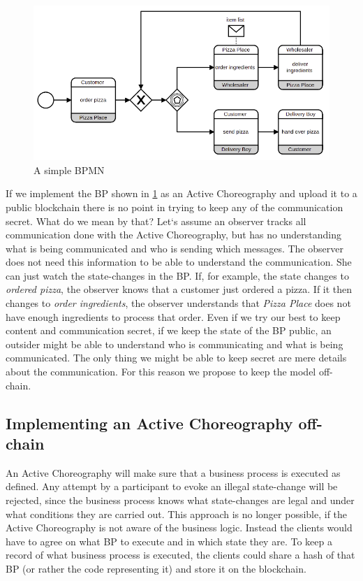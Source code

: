\documentclass[runningheads]{llncs}
\begin{document}
\begin{figure}
    \centering
    \includegraphics[scale=0.6]{bpmn.png}
    \caption{A simple BPMN}
    \label{fig:BPmn}
\end{figure}

If we implement the BP shown in \ref{fig:BPmn} as an Active Choreography and upload it to a public blockchain there is no point in trying to keep any of the communication secret. What do we mean by that? Let`s assume an observer tracks all communication done with the Active Choreography, but has no understanding what is being communicated and who is sending which messages. The observer does not need this information to be able to understand the communication. She can just watch the state-changes in the BP. If, for example, the state changes to \textit{ordered pizza}, the observer knows that a customer just ordered a pizza. If it then changes to \textit{order ingredients}, the observer understands that \textit{Pizza Place} does not have enough ingredients to process that order. Even if we try our best to keep content and communication secret, if we keep the state of the BP public, an outsider might be able to understand who is communicating and what is being communicated. The only thing we might be able to keep secret are mere details about the communication. For this reason we propose to keep the model off-chain. 


\subsection{Implementing an Active Choreography off-chain}

An Active Choreography will make sure that a business process is executed as defined. Any attempt by a participant to evoke an illegal state-change will be rejected, since the business process knows what state-changes are legal and under what conditions they are carried out. This approach is no longer possible, if the Active Choreography is not aware of the business logic. Instead the clients would have to agree on what BP to execute and in which state they are. To keep a record of what business process is executed, the clients could share a hash of that BP (or rather the code representing it) and store it on the blockchain. 
\end{document}

